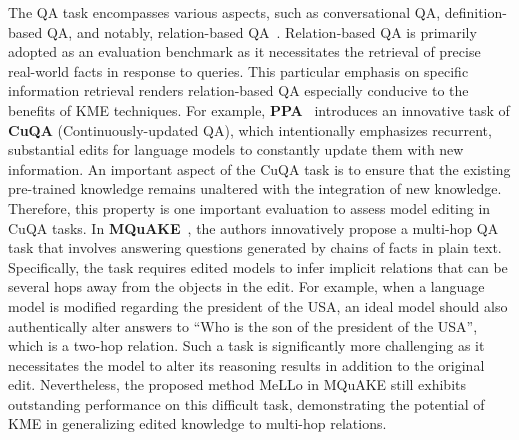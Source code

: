 \documentclass[acmsmall, screen]{acmart}
\begin{document}


 The QA task encompasses various aspects, such as conversational QA, definition-based QA, and notably, relation-based QA~\cite{pandya2021question}. Relation-based QA is primarily adopted as an evaluation benchmark as it necessitates the retrieval of precise real-world facts in response to queries. This particular emphasis on specific information retrieval renders relation-based QA especially conducive to the benefits of KME techniques. For example, \textbf{PPA}~\cite{lee2022plugandplay} introduces an innovative task of \textbf{CuQA} (Continuously-updated QA), which intentionally emphasizes recurrent, substantial edits for language models to constantly update them with new information. An important aspect of the {CuQA} task is to ensure that the existing pre-trained knowledge remains unaltered with the integration of new knowledge. Therefore, this property is one important evaluation to assess model editing in CuQA tasks. 
In \textbf{MQuAKE}~\cite{MQuAKE}, the authors innovatively propose a multi-hop QA task that involves answering questions generated by chains of facts in plain text. Specifically, the task requires edited models to infer implicit relations that can be several hops away from the objects in the edit. For example, when a language model is modified regarding the president of the USA, an ideal model should also authentically alter answers to ``Who is the son of the president of the USA'', which is a two-hop relation. Such a task is significantly more challenging as it necessitates the model to alter its reasoning results in addition to the original edit. Nevertheless, the proposed method MeLLo in MQuAKE still exhibits outstanding performance on this difficult task, demonstrating the potential of KME in generalizing edited knowledge to multi-hop relations.
\end{document}
